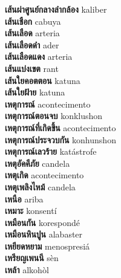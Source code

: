 \textbf{ เส้นผ่าศูนย์กลางลำกล้อง  } kaliber \\
\textbf{ เส้นเชือก  } cabuya \\
\textbf{ เส้นเลือด  } arteria \\
\textbf{ เส้นเลือดดำ  } ader \\
\textbf{ เส้นเลือดแดง  } arteria \\
\textbf{ เส้นแบ่งเขต  } rant \\
\textbf{ เส้นใยคอตตอน  } katuna \\
\textbf{ เส้นใยฝ้าย  } katuna \\
\textbf{ เหตุการณ์  } acontecimento \\
\textbf{ เหตุการณ์ตอนจบ  } konklushon \\
\textbf{ เหตุการณ์ที่เกิดขึ้น  } acontecimento \\
\textbf{ เหตุการณ์ประจวบกัน  } konhunshon \\
\textbf{ เหตุการณ์เลวร้าย  } katástrofe \\
\textbf{ เหตุอัคคีภัย  } candela \\
\textbf{ เหตุเกิด  } acontecimento \\
\textbf{ เหตุเพลิงไหม้  } candela \\
\textbf{ เหนือ  } ariba \\
\textbf{ เหมาะ  } konsentí \\
\textbf{ เหมือนกัน  } korespondé \\
\textbf{ เหมือนหินปูน  } alabaster \\
\textbf{ เหยียดหยาม  } menospresiá \\
\textbf{ เหรียญเพนนี  } sèn \\
\textbf{ เหล้า  } alkohòl \\
